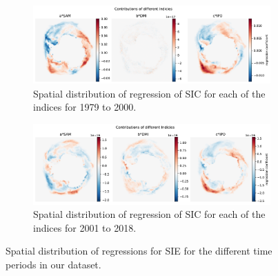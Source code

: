\begin{figure}[H]
    \begin{subfigure}{\linewidth}
    \centering
    \includegraphics[width=\linewidth]{Images_3.0/regressions/index_contribution_anomalous_n1_annually_1979_2000.pdf}
    \caption{Spatial distribution of regression of SIC for each of the indices for 1979 to 2000.}
    \label{fig:index_contribution_anomalous_n1_annually_1979_2000}
    \end{subfigure}
    
    \begin{subfigure}{\linewidth}
    \centering
    \includegraphics[width=\linewidth]{Images_3.0/regressions/index_contribution_anomalous_n1_annually_2001_2018.pdf}
    \caption{Spatial distribution of regression of SIC for each of the indices for 2001 to 2018.}
    \label{fig:index_contribution_anomalous_n1_annually_2001_2018}
    \end{subfigure}
    \caption{Spatial distribution of regressions for SIE for the different time periods in our dataset.}
\end{figure}